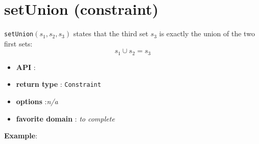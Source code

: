 \label{setunion}
\hypertarget{setunion}{}

\section{setUnion (constraint)}\label{setunion:setunionconstraint}\hypertarget{setunion:setunionconstraint}{}
\begin{notedef}
  \texttt{setUnion}$(s_1,s_2,s_3)$ states that the third set $s_3$ is exactly the union of the two first sets:
$$s_1\cup s_2=s_3$$
\end{notedef}

\begin{itemize}
	\item \textbf{API} : 
	\item \textbf{return type} : \texttt{Constraint}
	\item \textbf{options} :\emph{n/a}
	\item \textbf{favorite domain} : \emph{to complete}
\end{itemize}

\textbf{Example}:
